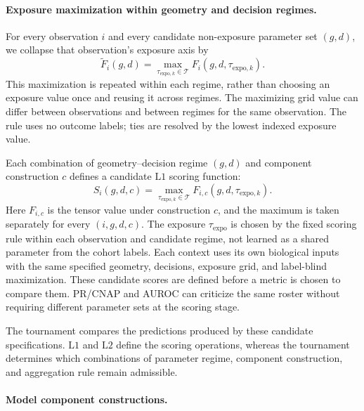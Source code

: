 \documentclass[11pt]{article}
\begin{document}
\paragraph{Exposure maximization within geometry and decision regimes.}

For every observation \(i\) and every candidate non-exposure parameter set
\((g,d)\), we collapse that observation's exposure axis by
\begin{equation}
\widetilde F_i(g,d)
=
\max_{\tau_{\mathrm{expo},k}\in\mathcal{T}}
F_i(g,d,\tau_{\mathrm{expo},k}).
\label{eq:tau_profile}
\end{equation}
This maximization is repeated within each regime, rather than choosing an
exposure value once and reusing it across regimes. The maximizing grid value
can differ between observations and between regimes for the same observation.
The rule uses no outcome labels; ties are resolved by the lowest indexed
exposure value.

Each combination of geometry--decision regime \((g,d)\) and component
construction \(c\) defines a candidate \(\mathrm{L1}\) scoring function:
\begin{equation}
S_i(g,d,c)
=
\max_{\tau_{\mathrm{expo},k}\in\mathcal{T}}
F_{i,c}(g,d,\tau_{\mathrm{expo},k}).
\label{eq:l1_score}
\end{equation}
Here \(F_{i,c}\) is the tensor value under construction \(c\), and the maximum
is taken separately for every \((i,g,d,c)\). The exposure \(\tau_{\mathrm{expo}}\) is
chosen by the fixed scoring rule within each observation and candidate regime,
not learned as a shared parameter from the cohort labels. Each context uses
its own biological inputs with the same specified geometry, decisions, exposure
grid, and label-blind maximization. These candidate scores are defined before a metric is
chosen to compare them. PR/CNAP and AUROC can criticize the same roster without
requiring different parameter sets at the scoring stage.

The tournament compares the predictions produced by these candidate
specifications. \(\mathrm{L1}\) and \(\mathrm{L2}\) define the
scoring operations, whereas the tournament determines which combinations of
parameter regime, component construction, and aggregation rule remain
admissible.

\paragraph{Model component constructions.}
\end{document}
